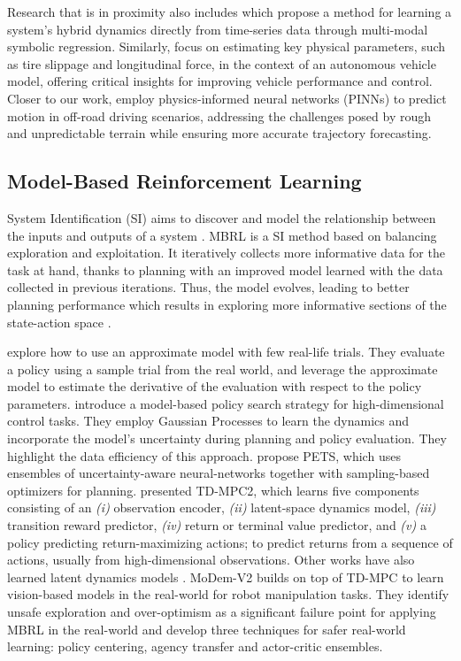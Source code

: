 \documentclass[Afour,sageh,times]{sagej}
\theoremstyle{lemma}
\begin{document}
Research that is in proximity also includes \citet{ly2012learning} which propose a method for learning a system's hybrid dynamics directly from time-series data through multi-modal symbolic regression. Similarly, \cite{kim2022physics} focus on estimating key physical parameters, such as tire slippage and longitudinal force, in the context of an autonomous vehicle model, offering critical insights for improving vehicle performance and control. Closer to our work, \cite{zhao2024physord} employ physics-informed neural networks (PINNs) to predict motion in off-road driving scenarios, addressing the challenges posed by rough and unpredictable terrain while ensuring more accurate trajectory forecasting.

\subsection{Model-Based Reinforcement Learning} 

System Identification (SI) aims to discover and model the relationship between the inputs and outputs of a system \cite[]{aastrom1971system, ljung2010perspectives}. MBRL is a SI method based on balancing exploration and exploitation. It iteratively collects more informative data for the task at hand, thanks to planning with an improved model learned with the data collected in previous iterations. Thus, the model evolves, leading to better planning performance which results in exploring more informative sections of the state-action space \cite[]{sutton2018reinforcement}.

\cite{abbeel2006using} explore how to use an approximate model with few real-life trials. They evaluate a policy using a sample trial from the real world, and leverage the approximate model to estimate the derivative of the evaluation with respect to the policy parameters. \cite{deisenroth2011pilco} introduce a model-based policy search strategy for high-dimensional control tasks. They employ Gaussian Processes to learn the dynamics and incorporate the model's uncertainty during planning and policy evaluation. They highlight the data efficiency of this approach. \citet{chua2018deep} propose PETS, which uses ensembles of uncertainty-aware neural-networks together with sampling-based optimizers for planning. 
\citet{hansen2023td} presented TD-MPC2, which learns five components consisting of an \textit{(i)} observation encoder, \textit{(ii)} latent-space dynamics model, \textit{(iii)} transition reward predictor, \textit{(iv)} return or terminal value predictor, and \textit{(v)} a policy predicting return-maximizing actions; to predict returns from a sequence of actions, usually from high-dimensional observations. Other works have also learned latent dynamics models \cite[]{ha2018world, hafner2019dream}. MoDem-V2 \cite[]{lancaster2023modem} builds on top of TD-MPC to learn vision-based models in the real-world for robot manipulation tasks. They identify unsafe exploration and over-optimism as a significant failure point for applying MBRL in the real-world and develop three techniques for safer real-world learning: policy centering, agency transfer and actor-critic ensembles. 
\end{document}
